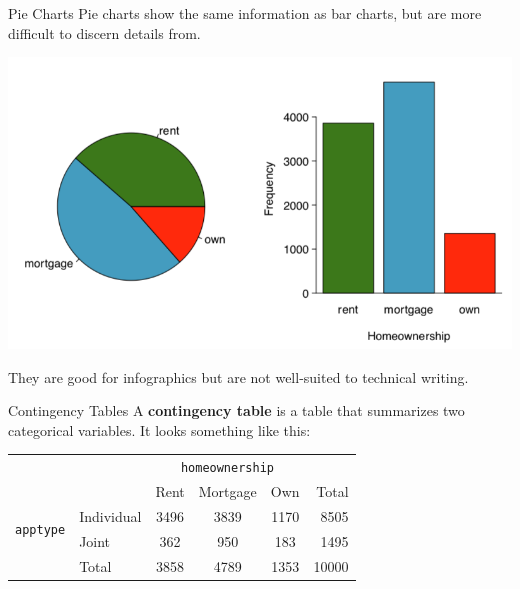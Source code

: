 \begin{frame}{Pie Charts}
    Pie charts show the same information as bar charts, but are more difficult to discern details from. 
    \begin{center}
        \includegraphics[scale=0.3]{images/piechart.png}
    \end{center}
    They are good for infographics but are not well-suited to technical writing.
\end{frame}

\begin{frame}{Contingency Tables}
    A \textbf{contingency table} is a table that summarizes two categorical variables. It looks something like this:
    \begin{center}
        \begin{tabular}{r l ccc r}
		& & \multicolumn{3}{c}{{\texttt{homeownership}}} & \\
        \cline{3-5}
		& & Rent & Mortgage & Own & Total  \\ 
        \cline{2-6}
        \multirow{2}{*}{{\texttt{apptype}}} 
        & Individual & 3496 & 3839 & 1170 & 8505 \\ 
  		& Joint & 362 & 950 & 183 & 1495 \\ 
        \cline{2-6}
  		& Total	& 3858 & 4789 & 1353 & 10000 \\
        \cline{2-6}
    \end{tabular}
    \end{center}
\end{frame}

